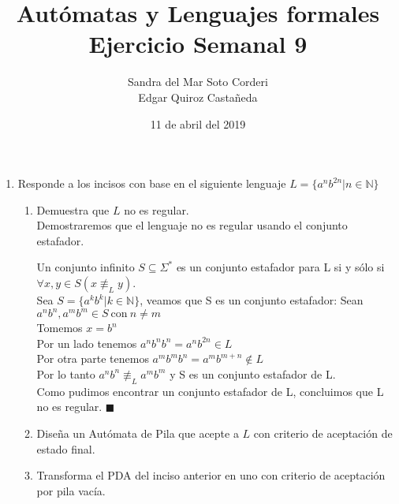 \documentclass{article}
\begin{document}
    \title{
        Autómatas y Lenguajes formales \\
        Ejercicio Semanal 9
    }

    \author{
        Sandra del Mar Soto Corderi \\
        Edgar Quiroz Castañeda
    }

    \date{
        11 de abril del 2019
    }
    
    \maketitle

    \begin{enumerate}
        \item {
        Responde a los incisos con base en el siguiente lenguaje $L = \{a^nb^{2n} | n \in \mathbb{N}\}$
        \begin{enumerate}
        	\item {
        	Demuestra que $L$ no es regular.\\
        	
        	Demostraremos que el lenguaje no es regular usando el conjunto estafador.
        	
        	Un conjunto infinito $S \subseteq \Sigma^*$ es un conjunto estafador para L si y sólo si $\forall x,y \in S (x \not\equiv_L y)$.\\
        	
        	Sea $S = \{ a^kb^k | k \in \mathbb{N}\}$, veamos que S es un conjunto estafador: Sean $a^nb^n , a^mb^m \in S \ \text{con} \ n \neq m$\\
        	
        	Tomemos $x = b^n$\\
        	Por un lado tenemos $ a^nb^nb^n = a^nb^{2n} \in L$\\
        	Por otra parte tenemos $a^mb^mb^n = a^mb^{m + n} \not \in L$\\
        	Por lo tanto $a^nb^n \not\equiv_L a^mb^m$ y S es un conjunto estafador de L.\\
        	
        	Como pudimos encontrar un conjunto estafador de L, concluimos que L no es regular. $\blacksquare$\\
        	
        	}
        	\item{
        	Diseña un Autómata de Pila que acepte a $L$ con criterio de aceptación de estado final.\\
        	
        	
        	}
        	\item{
        	Transforma el PDA del inciso anterior en uno con criterio de aceptación por pila vacía.
        	
        	}
        \end{enumerate}
    	}
    \end{enumerate}
\end{document}
